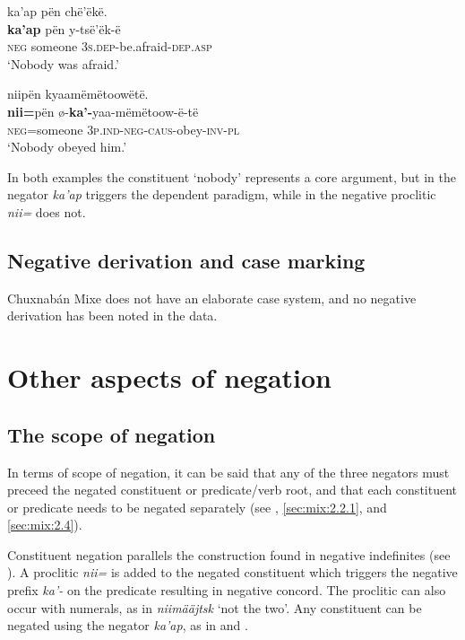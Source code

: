 \documentclass[output=paper,colorlinks,citecolor=brown,draft]{langscibook}
\begin{document}
\ea\label{ex:mix:115}
    \glll ka’ap pën chë’ëkë. \\
          \textbf{ka’ap} pën y-tsë’ëk-ë \\
          \textsc{neg} someone \textsc{3s.dep}{}-be.afraid-\textsc{dep.asp} \\
    \glt ‘Nobody was afraid.’
\z

\ea\label{ex:mix:116}
    \glll niipën kyaamëmëtoowëtë. \\
          \textbf{nii=}pën ø-\textbf{ka’-}yaa-mëmëtoow-ë-të \\
          \textsc{neg=}someone \textsc{3p.ind}{}-\textsc{neg-caus}{}-obey-\textsc{inv-pl}\\
    \glt ‘Nobody obeyed him.’
\z

In both examples the constituent ‘nobody’ represents a core argument, but in  the negator \textit{ka’ap} triggers the dependent paradigm, while in  the negative proclitic \textit{nii=} does not. 

\subsection{Negative derivation and case marking}\label{sec:mix:3.3}

Chuxnabán Mixe does not have an elaborate case system, and no negative derivation has been noted in the data.

\section{Other aspects of negation}\label{sec:mix:4}

\subsection{The scope of negation}\label{sec:mix:4.1}

In terms of scope of negation, it can be said that any of the three negators must preceed the negated constituent or predicate/verb root, and that each constituent or predicate needs to be negated separately (see , \ref{sec:mix:2.2.1}, and \ref{sec:mix:2.4}). 

Constituent negation parallels the construction found in negative indefinites (see ). A proclitic \textit{nii=} is added to the negated constituent which triggers the negative prefix \textit{ka’-} on the predicate resulting in negative concord. The proclitic can also occur with numerals, as in \textit{niimääjtsk} ‘not the two’. Any constituent can be negated using the negator \textit{ka’ap}, as in  and .
\end{document}
